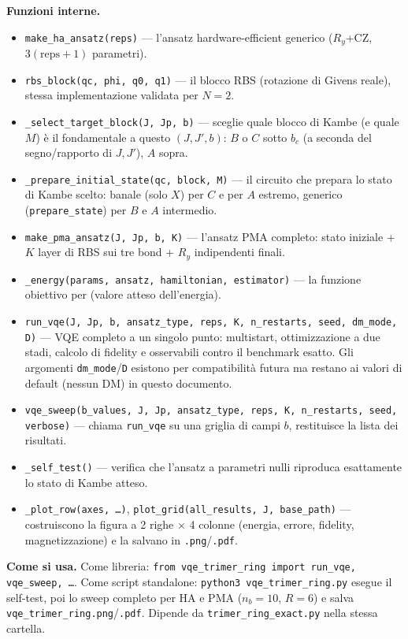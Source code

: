\documentclass[11pt,a4paper]{article}
\begin{document}
\textbf{Funzioni interne.}
\begin{itemize}
\item \texttt{make\_ha\_ansatz(reps)} — l'ansatz hardware-efficient generico
($R_y$+CZ, $3(\text{reps}{+}1)$ parametri).
\item \texttt{rbs\_block(qc,\ phi,\ q0,\ q1)} — il blocco RBS (rotazione di Givens
reale), stessa implementazione validata per $N=2$.
\item \texttt{\_select\_target\_block(J,\ Jp,\ b)} — sceglie quale blocco di Kambe
(e quale $M$) è il fondamentale a questo $(J,J',b)$: $B$ o $C$ sotto $b_c$ (a
seconda del segno/rapporto di $J,J'$), $A$ sopra.
\item \texttt{\_prepare\_initial\_state(qc,\ block,\ M)} — il circuito che prepara
lo stato di Kambe scelto: banale (solo $X$) per $C$ e per $A$ estremo, generico
(\texttt{prepare\_state}) per $B$ e $A$ intermedio.
\item \texttt{make\_pma\_ansatz(J,\ Jp,\ b,\ K)} — l'ansatz PMA completo: stato
iniziale + $K$ layer di RBS sui tre bond + $R_y$ indipendenti finali.
\item \texttt{\_energy(params,\ ansatz,\ hamiltonian,\ estimator)} — la funzione
obiettivo per \texttt{} (valore atteso dell'energia).
\item \texttt{run\_vqe(J,\ Jp,\ b,\ ansatz\_type,\ reps,\ K,\ n\_restarts,\ seed,\
dm\_mode,\ D)} — VQE completo a un singolo punto: multistart, ottimizzazione a due
stadi, calcolo di fidelity e osservabili contro il benchmark esatto. Gli argomenti
\texttt{dm\_mode}/\texttt{D} esistono per compatibilità futura ma restano ai valori
di default (nessun DM) in questo documento.
\item \texttt{vqe\_sweep(b\_values,\ J,\ Jp,\ ansatz\_type,\ reps,\ K,\
n\_restarts,\ seed,\ verbose)} — chiama \texttt{run\_vqe} su una griglia di campi
$b$, restituisce la lista dei risultati.
\item \texttt{\_self\_test()} — verifica che l'ansatz a parametri nulli riproduca
esattamente lo stato di Kambe atteso.
\item \texttt{\_plot\_row(axes,\ \ldots)}, \texttt{plot\_grid(all\_results,\ J,\
base\_path)} — costruiscono la figura a 2 righe $\times$ 4 colonne (energia, errore,
fidelity, magnetizzazione) e la salvano in \texttt{.png}/\texttt{.pdf}.
\end{itemize}

\textbf{Come si usa.} Come libreria: \texttt{from vqe\_trimer\_ring import
run\_vqe, vqe\_sweep, \ldots}. Come script standalone: \texttt{python3
vqe\_trimer\_ring.py} esegue il self-test, poi lo sweep completo per HA e PMA
($n_b=10$, $R=6$) e salva \texttt{vqe\_trimer\_ring.png}/\texttt{.pdf}. Dipende da
\texttt{trimer\_ring\_exact.py} nella stessa cartella.
\end{document}
